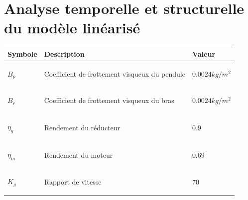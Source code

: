 \documentclass[12pt, a4paper, openany]{report}
\begin{document}
\chapter{Analyse temporelle et structurelle du modèle linéarisé }
\begin{center}
\begin{tabular}{|R{2cm}|C{8cm}|L{2.5cm}|} 
\hline {} Symbole & Description &  Valeur  \\
\hline  \begin{center} $B_{p}$\end{center}  &  \begin{center}Coefficient de frottement visqueux du pendule\end{center}  & \begin{center}$0.0024 kg/m^{2}$ \end{center}  \\
\hline  \begin{center} $B_{r}$\end{center} & \begin{center}Coefficient de frottement visqueux du bras\end{center} & \begin{center}$0.0024 kg/m^{2}$ \end{center}\\
\hline  \begin{center} $\eta_{g}$\end{center}  &  \begin{center}Rendement du réducteur\end{center}  & \begin{center}$0.9$ \end{center}  \\
\hline  \begin{center} $\eta_{m}$\end{center}  &  \begin{center}Rendement du moteur\end{center}  & \begin{center}$0.69$ \end{center}  \\
\hline  \begin{center} $K_{g}$\end{center}  &  \begin{center}Rapport de vitesse\end{center}  & \begin{center}$70$ \end{center}  \\

\end{tabular}
\end{center}
\end{document}
